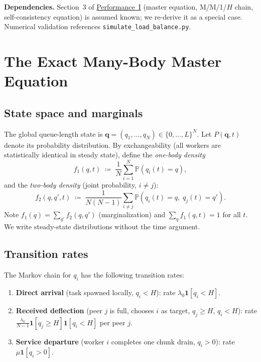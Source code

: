 \documentclass[11pt,a4paper]{article}
\newcommand{\fone}{f_1}
\newcommand{\ftwo}{f_2}
\newcommand{\bP}{\mathbb{P}}
\begin{document}
\noindent\textbf{Dependencies.}
Section~3 of \hyperref[chap:load_balance]{Performance~I} (master equation, M/M/1/$H$ chain,
self-consistency equation) is assumed known; we re-derive it as a special case.
Numerical validation references \texttt{simulate\_load\_balance.py}.

\section{The Exact Many-Body Master Equation}

\subsection{State space and marginals}

The global queue-length state is
$\mathbf{q} = (q_1, \ldots, q_N) \in \{0, \ldots, L\}^N$.
Let $P(\mathbf{q}, t)$ denote its probability distribution.
By exchangeability (all workers are statistically identical in steady state),
define the \emph{one-body density}
\[
  \fone(q, t) \;\coloneqq\; \frac{1}{N} \sum_{i=1}^N \bP(q_i(t) = q),
\]
and the \emph{two-body density} (joint probability, $i \neq j$):
\[
  \ftwo(q, q', t) \;\coloneqq\; \frac{1}{N(N-1)} \sum_{i \neq j}
  \bP(q_i(t) = q,\; q_j(t) = q').
\]
Note $\fone(q) = \sum_{q'} \ftwo(q,q')$ (marginalization)
and $\sum_q \fone(q,t) = 1$ for all $t$.
We write steady-state distributions without the time argument.

\subsection{Transition rates}
\label{sec:mmp-rates}

The Markov chain for $q_i$ has the following transition rates:

\begin{enumerate}
  \item \textbf{Direct arrival} (task spawned locally, $q_i < H$):
        rate $\lambda_0 \mathbf{1}[q_i < H]$.

  \item \textbf{Received deflection} (peer $j$ is full, chooses $i$ as target,
        $q_j \geq H$, $q_i < H$):
        rate $\frac{\lambda_0}{N-1} \mathbf{1}[q_j \geq H] \mathbf{1}[q_i < H]$
        per peer $j$.

  \item \textbf{Service departure} (worker $i$ completes one chunk drain,
        $q_i > 0$):
        rate $\mu \mathbf{1}[q_i > 0]$.
\end{enumerate}
\end{document}
